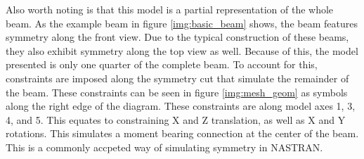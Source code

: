 Also worth noting is that this model is a partial representation of the whole beam. As the example beam in figure \ref{img:basic_beam} shows, the beam features symmetry along the front view. Due to the typical construction of these beams, they also exhibit symmetry along the top view as well. Because of this, the model presented is only one quarter of the complete beam. To account for this, constraints are imposed along the symmetry cut that simulate the remainder of the beam. These constraints can be seen in figure \ref{img:mesh_geom} as symbols along the right edge of the diagram. These constraints are along model axes 1, 3, 4, and 5. This equates to constraining X and Z translation, as well as X and Y rotations. This simulates a moment bearing connection at the center of the beam. This is a commonly accpeted way of simulating symmetry in NASTRAN. 

